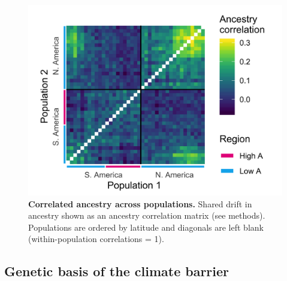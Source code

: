 \begin{figure}[ht]
\includegraphics[width = .8\textwidth]{chapter1/figures/k_correlation_matrix_all_pops.png}
\caption{
\textbf{Correlated ancestry across populations.} Shared drift in ancestry shown as an ancestry correlation matrix (see methods). Populations are ordered by latitude and diagonals are left blank (within-population correlations = 1). }
\label{K_matrix}
\end{figure}


\subsection*{Genetic basis of the climate barrier}

